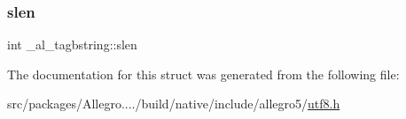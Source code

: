 \mbox{\label{struct__al__tagbstring_a96f3400977aa0706a99b2a4c51c1f429}} 
\subsubsection{\texorpdfstring{slen}{slen}}
{\footnotesize\ttfamily int \+\_\+al\+\_\+tagbstring\+::slen}



The documentation for this struct was generated from the following file\+:\begin{DoxyCompactItemize}
\item 
src/packages/\+Allegro..../build/native/include/allegro5/\hyperlink{utf8_8h}{utf8.\+h}\end{DoxyCompactItemize}
